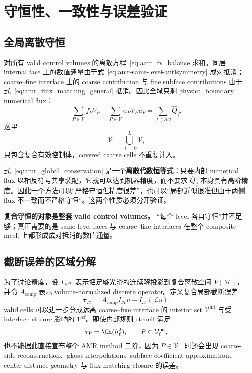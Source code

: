 \section{守恒性、一致性与误差验证}
\label{sec:amr-verification}

\subsection{全局离散守恒}

对所有 valid control volumes 的离散方程~\eqref{eq:amr_fv_balance}求和。同层 internal face 上的数值通量由于式~\eqref{eq:amr-same-level-antisymmetry} 成对抵消；coarse--fine interface 上的 coarse contribution 与 fine subface contributions 由于式~\eqref{eq:amr_flux_matching_general} 抵消。因此全域只剩 physical boundary numerical flux：
\begin{equation}
\boxed{
\sum_{P\in\mathcal V}f_PV_P
-
\sum_{P\in\mathcal V}\alpha_PV_Pu_P
=
\sum_{f\subset\partial\Omega}\widehat Q_f.
}
\label{eq:amr_global_conservation}
\end{equation}
这里
\begin{equation}
\mathcal V=\bigcup_{\ell=0}^{L}\mathcal V_\ell
\end{equation}
只包含复合有效控制体，covered coarse cells 不重复计入。

式~\eqref{eq:amr_global_conservation} 是一个\textbf{离散代数恒等式}：只要内部 numerical flux 以相反符号共享装配，它就可以达到机器精度，而不要求 $\widehat Q_f$ 本身具有高阶精度。因此一个方法可以“严格守恒但精度很差”，也可以“局部近似很准但由于两侧 flux 不一致而不严格守恒”。这两个性质必须分开验证。

\begin{keybox}
\textbf{复合守恒的对象是整套 valid control volumes。}
“每个 level 各自守恒”并不足够；真正需要的是 same-level faces 与 coarse--fine interfaces 在整个 composite mesh 上都形成成对抵消的数值通量。
\end{keybox}

\subsection{截断误差的区域分解}

为了讨论精度，设 $I_{\mathcal H}u$ 表示把足够光滑的连续解投影到复合离散空间 $V(\mathcal H)$，并令 $A_{\mathrm{comp}}$ 表示 volume-normalized discrete operator。定义复合局部截断误差
\begin{equation}
\boxed{
\bm\tau_{\mathcal H}
=
A_{\mathrm{comp}}I_{\mathcal H}u
-
I_{\mathcal H}(\mathcal Lu).
}
\label{eq:amr-composite-truncation-error}
\end{equation}
valid cells 可以进一步分成远离 coarse--fine interface 的 interior set $\mathcal V^{\mathrm{int}}$ 与受 interface closure 影响的 $\mathcal V^{\mathrm{cf}}$。即使内部规则 stencil 满足
\begin{equation}
\tau_P=\Oh(h_\ell^2),
\qquad P\in\mathcal V_\ell^{\mathrm{int}},
\end{equation}
也不能据此直接宣布整个 AMR method 二阶，因为 $P\in\mathcal V^{\mathrm{cf}}$ 时还会出现 coarse-side reconstruction、ghost interpolation、subface coefficient approximation、center-distance geometry 与 flux matching closure 的误差。

